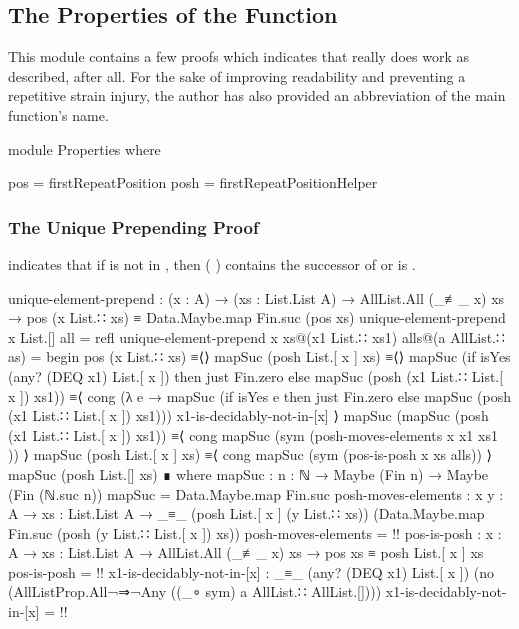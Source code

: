\documentclass{report}
\begin{document}
\subsection{The Properties of the Function}
This module contains a few proofs which indicates that  really does work as described, after all.  For the sake of improving readability and preventing a repetitive strain injury, the author has also provided an abbreviation of the main function's name.

\begin{code}
  module Properties where

    pos = firstRepeatPosition
    posh = firstRepeatPositionHelper
\end{code}

\subsubsection{The Unique Prepending Proof}
 indicates that if  is not in , then  \AgdaSymbol(  \AgdaSymbol) contains the successor of   or is .

\begin{code}
    unique-element-prepend :
      (x : A) →
      (xs : List.List A) →
      AllList.All (_≢_ x) xs →
      pos (x List.∷ xs) ≡ Data.Maybe.map Fin.suc (pos xs)
    unique-element-prepend x List.[] all = refl
    unique-element-prepend x xs@(x1 List.∷ xs1) alls@(a AllList.∷ as) = begin
      pos (x List.∷ xs)
        ≡⟨⟩
      mapSuc (posh List.[ x ] xs)
        ≡⟨⟩
      mapSuc
        (if isYes (any? (DEQ x1) List.[ x ])
            then just Fin.zero
            else mapSuc (posh (x1 List.∷ List.[ x ]) xs1))
        ≡⟨ cong (λ e → mapSuc (if isYes e
                                   then just Fin.zero
                                   else mapSuc (posh (x1 List.∷ List.[ x ]) xs1)))
                x1-is-decidably-not-in-[x] ⟩
      mapSuc (mapSuc (posh (x1 List.∷ List.[ x ]) xs1))
        ≡⟨ cong mapSuc (sym (posh-moves-elements {x} {x1} {xs1} )) ⟩
      mapSuc (posh List.[ x ] xs)
        ≡⟨ cong mapSuc (sym (pos-is-posh {x} {xs} alls)) ⟩
      mapSuc (posh List.[] xs) ∎
      where
      mapSuc : {n : ℕ} → Maybe (Fin n) → Maybe (Fin (ℕ.suc n))
      mapSuc = Data.Maybe.map Fin.suc
      posh-moves-elements :
        {x y : A} →
        {xs : List.List A} →
        _≡_ (posh List.[ x ] (y List.∷ xs))
            (Data.Maybe.map Fin.suc (posh (y List.∷ List.[ x ]) xs))
      posh-moves-elements = {!!}
      pos-is-posh :
        {x : A} →
        {xs : List.List A} →
        AllList.All (_≢_ x) xs →
        pos xs ≡ posh List.[ x ] xs
      pos-is-posh = {!!}
      x1-is-decidably-not-in-[x] :
        _≡_ (any? (DEQ x1) List.[ x ])
            (no (AllListProp.All¬⇒¬Any ((_∘ sym) a AllList.∷ AllList.[])))
      x1-is-decidably-not-in-[x] = {!!}
\end{code}
\end{document}
